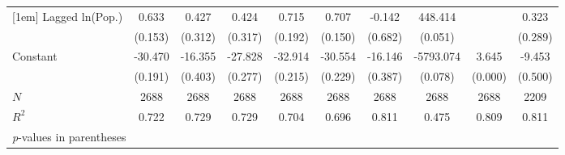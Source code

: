 \begin{tabular}{l*{9}{c}}
[1em]
Lagged ln(Pop.)&       0.633&       0.427&       0.424&       0.715&       0.707&      -0.142&     448.414&            &       0.323\\
            &     (0.153)&     (0.312)&     (0.317)&     (0.192)&     (0.150)&     (0.682)&     (0.051)&            &     (0.289)\\
[1em]
Constant    &     -30.470&     -16.355&     -27.828&     -32.914&     -30.554&     -16.146&   -5793.074&       3.645&      -9.453\\
            &     (0.191)&     (0.403)&     (0.277)&     (0.215)&     (0.229)&     (0.387)&     (0.078)&     (0.000)&     (0.500)\\
\hline
\(N\)       &        2688&        2688&        2688&        2688&        2688&        2688&        2688&        2688&        2209\\
\(R^{2}\)   &       0.722&       0.729&       0.729&       0.704&       0.696&       0.811&       0.475&       0.809&       0.811\\
\hline\hline
\multicolumn{10}{l}{\footnotesize \textit{p}-values in parentheses}\\
\end{tabular}
